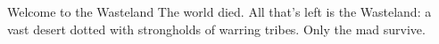 
\begin{abstractsection}{Welcome to the Wasteland}
The world died. All that's left is the Wasteland: a vast desert dotted with strongholds of warring tribes. Only the mad survive.
\end{abstractsection}
